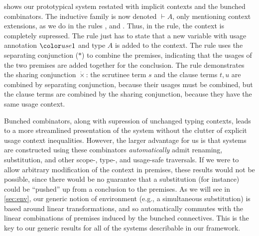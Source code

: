  shows our prototypical system restated with
implicit contexts and the bunched combinators. The inductive family is
now denoted $\vdash A$, only mentioning context extensions, as we do
in the rules ,
 and . Thus,
in the  rule, the context is completely
supressed. The  rule just has to state that a
new variable with usage annotation $\gr1$ and type $A$ is added to the
context. The  rule uses the separating
conjunction ($*$) to combine the premises, indicating that the
usages of the two premises are added together for the
conclusion. The  rule demonstrates the
sharing conjunction $\dot\times$: the scrutinee term $s$ and the
clause terms $t, u$ are combined by separating conjunction, because
their usages must be combined, but the clause terms are combined by
the sharing conjunction, because they have the same usage context.

Bunched combinators, along with supression of unchanged typing
contexts, leads to a more streamlined presentation of the system
without the clutter of explicit usage context
inequalities. However, the larger advantage for us is that systems are
constructed using these combinators \emph{automatically} admit
renaming, substitution, and other scope-, type-, and usage-safe
traversals. If we were to allow arbitrary modification of the context
in premises, these results would not be possible, since there would be
no guarantee that a substitution (for instance) could be ``pushed'' up
from a conclusion to the premises. As we will see in \cref{sec:env},
our generic notion of environment (e.g., a simultaneous substitution)
is based around linear transformations, and so automatically commutes
with the linear combinations of premises induced by the bunched
connectives. This is the key to our generic results for all of the
systems describable in our framework.
